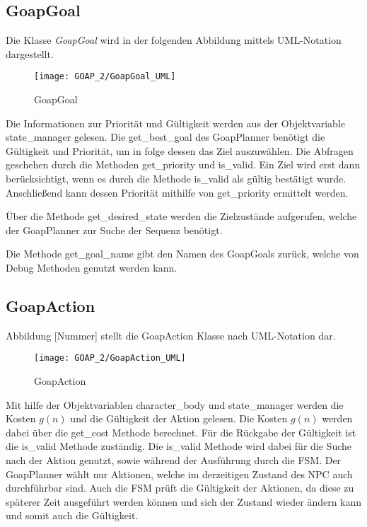 \subsection{GoapGoal}

Die Klasse \textit{GoapGoal} wird in der folgenden Abbildung mittels UML-Notation dargestellt. 

\begin{figure}[h]
  \centering
  \texttt{[image: GOAP\_2/GoapGoal\_UML]}
	\captionsetup{justification=justified, format=plain}
  \caption{GoapGoal}
  \label{GoapGoal}
\end{figure}

Die Informationen zur Priorität und Gültigkeit werden aus der Objektvariable state\_manager gelesen. Die get\_best\_goal des GoapPlanner benötigt die Gültigkeit und Priorität, um in folge dessen das Ziel auszuwählen. Die Abfragen geschehen durch die Methoden get\_priority und is\_valid. Ein Ziel wird erst dann berücksichtigt, wenn es durch die Methode is\_valid als gültig bestätigt wurde. Anschließend kann dessen Priorität mithilfe von get\_priority ermittelt werden. 

Über die Methode get\_desired\_state werden die Zielzustände aufgerufen, welche der GoapPlanner zur Suche der Sequenz benötigt. 

Die Methode get\_goal\_name gibt den Namen des GoapGoals zurück, welche von Debug Methoden genutzt werden kann.



\subsection{GoapAction}

Abbildung [Nummer] stellt die GoapAction Klasse nach UML-Notation dar.

\begin{figure}[h]
  \centering
  \texttt{[image: GOAP\_2/GoapAction\_UML]}
	\captionsetup{justification=justified, format=plain}
  \caption{GoapAction}
  \label{GoapAction}
\end{figure}

Mit hilfe der Objektvariablen character\_body und state\_manager werden die Kosten $g(n)$ und die Gültigkeit der Aktion gelesen. Die Kosten $g(n)$ werden dabei über die get\_cost Methode berechnet. Für die Rückgabe der Gültigkeit ist die is\_valid Methode zuständig. Die is\_valid Methode wird dabei für die Suche nach der Aktion genutzt, sowie während der Ausführung durch die FSM. Der GoapPlanner wählt nur Aktionen, welche im derzeitigen Zustand des NPC auch durchführbar sind. Auch die FSM prüft die Gültigkeit der Aktionen, da diese zu späterer Zeit ausgeführt werden können und sich der Zustand wieder ändern kann und somit auch die Gültigkeit.

